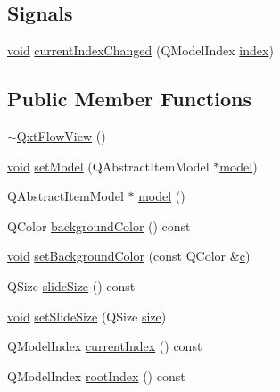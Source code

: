 \subsection*{Signals}
\begin{DoxyCompactItemize}
\item 
\hyperlink{group___u_a_v_objects_plugin_ga444cf2ff3f0ecbe028adce838d373f5c}{void} \hyperlink{class_qxt_flow_view_a83456b7e9c4594c0a1b6b7091ebad844}{current\-Index\-Changed} (Q\-Model\-Index \hyperlink{glext_8h_ab47dd9958bcadea08866b42bf358e95e}{index})
\end{DoxyCompactItemize}
\subsection*{Public Member Functions}
\begin{DoxyCompactItemize}
\item 
\hyperlink{class_qxt_flow_view_ae21bf86509327a84d89a2403110b7aaa}{$\sim$\-Qxt\-Flow\-View} ()
\item 
\hyperlink{group___u_a_v_objects_plugin_ga444cf2ff3f0ecbe028adce838d373f5c}{void} \hyperlink{class_qxt_flow_view_a1bf30d9c20b3836b5b9daa9f78207ed1}{set\-Model} (Q\-Abstract\-Item\-Model $\ast$\hyperlink{class_qxt_flow_view_a36fc8208a5fb318c57880046d5abdc40}{model})
\item 
Q\-Abstract\-Item\-Model $\ast$ \hyperlink{class_qxt_flow_view_a36fc8208a5fb318c57880046d5abdc40}{model} ()
\item 
Q\-Color \hyperlink{class_qxt_flow_view_a47fcffc1461d597dd14da4cb603e5cb4}{background\-Color} () const 
\item 
\hyperlink{group___u_a_v_objects_plugin_ga444cf2ff3f0ecbe028adce838d373f5c}{void} \hyperlink{class_qxt_flow_view_a73e9db7bfa071c628be3fcc8e2da6c23}{set\-Background\-Color} (const Q\-Color \&\hyperlink{glext_8h_a1f2d7f8147412c43ba2303a56f97ee73}{c})
\item 
Q\-Size \hyperlink{class_qxt_flow_view_a15cc32a8905581b8c0ff20b430214a50}{slide\-Size} () const 
\item 
\hyperlink{group___u_a_v_objects_plugin_ga444cf2ff3f0ecbe028adce838d373f5c}{void} \hyperlink{class_qxt_flow_view_a3cc18421376d185704b7e3ebc5130d0e}{set\-Slide\-Size} (Q\-Size \hyperlink{glext_8h_a014d89bd76f74ef3a29c8f04b473eb76}{size})
\item 
Q\-Model\-Index \hyperlink{class_qxt_flow_view_a9da9a4542681939e0c785ed34517e209}{current\-Index} () const 
\item 
Q\-Model\-Index \hyperlink{class_qxt_flow_view_af13c16e8d3f9662e702599028146d593}{root\-Index} () const 

\end{DoxyCompactItemize}

